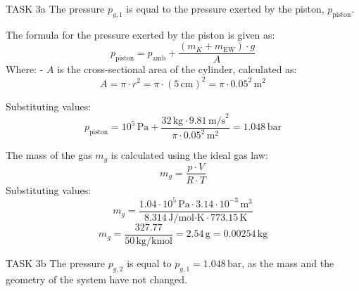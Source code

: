 TASK 3a  
The pressure \( p_{g,1} \) is equal to the pressure exerted by the piston, \( p_{\text{piston}} \).  

The formula for the pressure exerted by the piston is given as:  
\[
p_{\text{piston}} = p_{\text{amb}} + \frac{(m_K + m_{\text{EW}}) \cdot g}{A}
\]  
Where:  
- \( A \) is the cross-sectional area of the cylinder, calculated as:  
\[
A = \pi \cdot r^2 = \pi \cdot (5 \, \text{cm})^2 = \pi \cdot 0.05^2 \, \text{m}^2
\]  

Substituting values:  
\[
p_{\text{piston}} = 10^5 \, \text{Pa} + \frac{32 \, \text{kg} \cdot 9.81 \, \text{m/s}^2}{\pi \cdot 0.05^2 \, \text{m}^2} = 1.048 \, \text{bar}
\]  

The mass of the gas \( m_g \) is calculated using the ideal gas law:  
\[
m_g = \frac{p \cdot V}{R \cdot T}
\]  
Substituting values:  
\[
m_g = \frac{1.04 \cdot 10^5 \, \text{Pa} \cdot 3.14 \cdot 10^{-3} \, \text{m}^3}{8.314 \, \text{J/mol·K} \cdot 773.15 \, \text{K}}
\]  
\[
m_g = \frac{327.77}{50 \, \text{kg/kmol}} = 2.54 \, \text{g} = 0.00254 \, \text{kg}
\]  

TASK 3b  
The pressure \( p_{g,2} \) is equal to \( p_{g,1} = 1.048 \, \text{bar} \), as the mass and the geometry of the system have not changed.